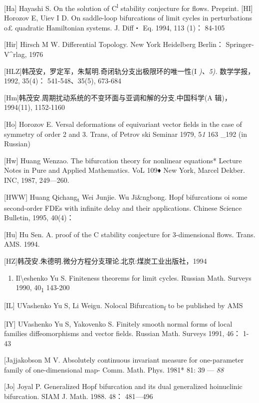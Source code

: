 \documentclass{article}
\begin{document}
{[}Ha{]} Hayashi S. On the solution of C\textsuperscript{l} stability
conjecture for flows. Preprint. {[}HI{]} Horozov E, Uiev I D. On
saddle-loop bifurcations of limit cycles in per­turbations o£ quadratic
Hamiltonian systems. J. Diff・ Eq. 1994, 113 (1)： 84-105

{[}Hir{]} Hirsch M W. Differential Topology. New York Heidelberg
Berlin： Springer-V\^{}rlag, 1976

{[}HLZ{]}韩茂安，罗定军，朱幫明.奇闭轨分支出极限环的唯一性(I
\emph{)、5).} 数学学报，1992, 35(4)： 541-548、35(5), 673-684

{[}Hm{]}韩茂安.周期扰动系统的不变环面与亚调和解的分支.中国科学(A
辑)，1994(11), 1152-1160

{[}Ho{]} Horozov E. Versal deformations of equivariant vector fields in
the case of symmetry of order 2 and 3. Trans, of Petrov ski Seminar
1979, 5\emph{1} 163 \_192 (in Russian)

{[}Hw{]} Huang Wenzao. The bifurcation theory for nonlinear equations*
Lecture Notes in Pure and Applied Mathematics. VoL 109♦ New York, Marcel
Dekber. INC, 1987, 249---260.

{[}HWW{]} Huang Qichang\textsubscript{t} Wei Junjie. Wu Ji\&ngbong. Hopf
bifurcations oi some second-order FDEs with infinite delay and their
applications. Chinese Science Bulletin, 1995, 40(4)：

{[}Hu{]} Hu Sen. A. proof of the C stability conjecture for
3-dimensional flows. Trans. AMS. 1994.

{[}HZ{]}韩茂安.朱德明.微分方程分支理论.北京:煤炭工业出版社，1994

\begin{enumerate}
\def\labelenumi{\Alph{enumi}.}
\setcounter{enumi}{8}
\item
  Il\textbackslash{}eshenko Yu S. Finiteness theorems for limit cycles.
  Russian Math. Surveys 1990, 40\textsubscript{1} 143-200
\end{enumerate}

{[}IL{]} UVashenko Yu S, Li Weigu. Nolocal Bifurcation\textsubscript{f}
to be published by AMS

{[}IY{]} UVashenko Yu S, Yakovenko S. Finitely smooth normal forms of
local families diffeomorphisms and vector fields. Russian Math. Surveys
1991, 46： 1-43

{[}Jajjakobson M V. Absolutely continuous invariant measure for
one-parame­ter family of one-dimensional map- Comm. Math. Phys. 1981*
81: 39 --- \emph{88}

{[}Jo{]} Joyal P. Generalized Hopf bifurcation and its dual generalized
hoinuclinic bifurcation. SIAM J. Math. 1988. 48： 481---496
\end{document}
